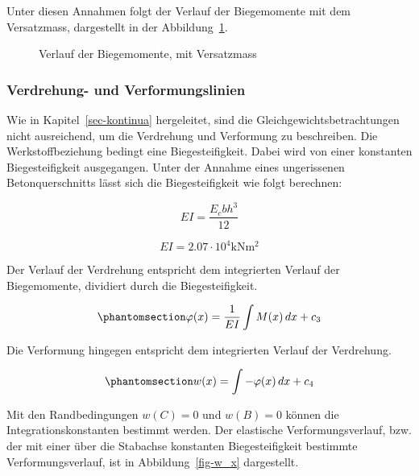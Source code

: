 \documentclass[
  12pt,
  letterpaper,
  egregdoesnotlikesansseriftitles]{scrreprt}
\begin{document}
Unter diesen Annahmen folgt der Verlauf der Biegemomente mit dem
Versatzmass, dargestellt in der Abbildung~\ref{fig-m_x_versatz}.

\begin{figure}[H]


\caption{\label{fig-m_x_versatz}Verlauf der Biegemomente, mit
Versatzmass}

\end{figure}%

\subsubsection{Verdrehung- und
Verformungslinien}\label{verdrehung--und-verformungslinien}

Wie in Kapitel~\ref{sec-kontinua} hergeleitet, sind die
Gleichgewichtsbetrachtungen nicht ausreichend, um die Verdrehung und
Verformung zu beschreiben. Die Werkstoffbeziehung bedingt eine
Biegesteifigkeit. Dabei wird von einer konstanten Biegesteifigkeit
ausgegangen. Unter der Annahme eines ungerissenen Betonquerschnitts
lässt sich die Biegesteifigkeit wie folgt berechnen:

\begin{equation}EI = \frac{E_{c} b h^{3}}{12}\end{equation}

\begin{equation}EI = 2.07 \cdot 10^{4} \text{kN} \text{m}^{2}\end{equation}

Der Verlauf der Verdrehung entspricht dem integrierten Verlauf der
Biegemomente, dividiert durch die Biegesteifigkeit.

\begin{equation}\phantomsection\label{eq-verdrehung}{
\varphi(x) = \frac{1}{EI}\int M(x) \, dx + c_3
}\end{equation}

Die Verformung hingegen entspricht dem integrierten Verlauf der
Verdrehung.

\begin{equation}\phantomsection\label{eq-verformung}{
w(x) = \int -\varphi(x) \, dx + c_4
}\end{equation}

Mit den Randbedingungen \(w(C) = 0\) und \(w(B) = 0\) können die
Integrationskonstanten bestimmt werden. Der elastische
Verformungsverlauf, bzw. der mit einer über die Stabachse konstanten
Biegesteifigkeit bestimmte Verformungsverlauf, ist in
Abbildung~\ref{fig-w_x} dargestellt.
\end{document}
